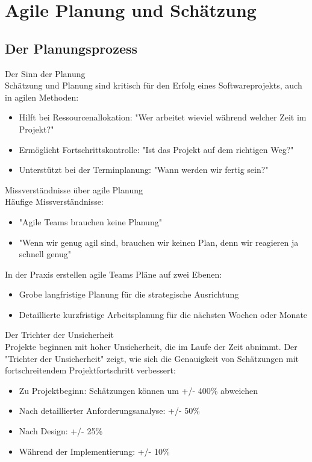 \section{Agile Planung und Schätzung}

\subsection{Der Planungsprozess}

\begin{concept}{Der Sinn der Planung}\\
    Schätzung und Planung sind kritisch für den Erfolg eines Softwareprojekts, auch in agilen Methoden:
    \begin{itemize}
        \item Hilft bei Ressourcenallokation: "Wer arbeitet wieviel während welcher Zeit im Projekt?"
        \item Ermöglicht Fortschrittskontrolle: "Ist das Projekt auf dem richtigen Weg?"
        \item Unterstützt bei der Terminplanung: "Wann werden wir fertig sein?"
    \end{itemize}
\end{concept}

\begin{concept}{Missverständnisse über agile Planung}\\
    Häufige Missverständnisse:
    \begin{itemize}
        \item "Agile Teams brauchen keine Planung"
        \item "Wenn wir genug agil sind, brauchen wir keinen Plan, denn wir reagieren ja schnell genug"
    \end{itemize}
    In der Praxis erstellen agile Teams Pläne auf zwei Ebenen:
    \begin{itemize}
        \item Grobe langfristige Planung für die strategische Ausrichtung
        \item Detaillierte kurzfristige Arbeitsplanung für die nächsten Wochen oder Monate
    \end{itemize}
\end{concept}

\begin{concept}{Der Trichter der Unsicherheit}\\
    Projekte beginnen mit hoher Unsicherheit, die im Laufe der Zeit abnimmt. Der "Trichter der Unsicherheit" zeigt, wie sich die Genauigkeit von Schätzungen mit fortschreitendem Projektfortschritt verbessert:
    \begin{itemize}
        \item Zu Projektbeginn: Schätzungen können um +/- 400\% abweichen
        \item Nach detaillierter Anforderungsanalyse: +/- 50\%
        \item Nach Design: +/- 25\%
        \item Während der Implementierung: +/- 10\%
    \end{itemize}
\end{concept}

